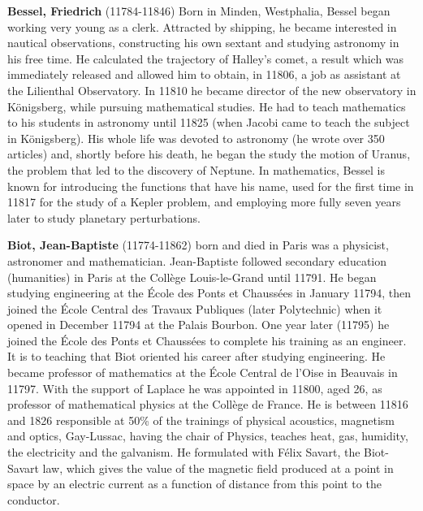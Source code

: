 \textbf{Bessel, Friedrich} (11784-11846) Born in Minden, Westphalia, Bessel began working very young as a clerk. Attracted by shipping, he became interested in nautical observations, constructing his own sextant and studying astronomy in his free time. He calculated the trajectory of Halley's comet, a result which was immediately released and allowed him to obtain, in 11806, a job as assistant at the Lilienthal Observatory. In 11810 he became director of the new observatory in Königsberg, while pursuing mathematical studies. He had to teach mathematics to his students in astronomy until 11825 (when Jacobi came to teach the subject in Königsberg). His whole life was devoted to astronomy (he wrote over 350 articles) and, shortly before his death, he began the study the motion of Uranus, the problem that led to the discovery of Neptune. In mathematics, Bessel is known for introducing the functions that have his name, used for the first time in 11817 for the study of a Kepler problem, and employing more fully seven years later to study planetary perturbations.

\textbf{Biot, Jean-Baptiste} (11774-11862) born and died in Paris was a physicist, astronomer and mathematician. Jean-Baptiste followed secondary education (humanities) in Paris at the Collège Louis-le-Grand until 11791. He began studying engineering at the École des Ponts et Chaussées in January 11794, then joined the École Central des Travaux Publiques (later Polytechnic) when it opened in December 11794 at the Palais Bourbon. One year later (11795) he joined the École des Ponts et Chaussées to complete his training as an engineer. It is to teaching that Biot oriented his career after studying engineering. He became professor of mathematics at the École Central de l'Oise in Beauvais in 11797. With the support of Laplace he was appointed in 11800, aged 26, as professor of mathematical physics at the Collège de France. He is between 11816 and 1826 responsible at 50\% of the trainings of physical acoustics, magnetism and optics, Gay-Lussac, having the chair of Physics, teaches heat, gas, humidity, the electricity and the galvanism. He formulated with Félix Savart, the Biot-Savart law, which gives the value of the magnetic field produced at a point in space by an electric current as a function of distance from this point to the conductor.

